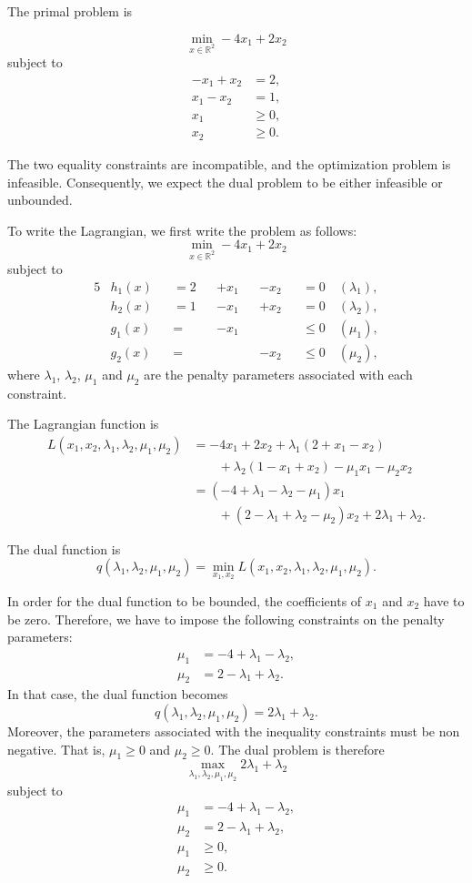 
The primal problem is

\[
\min_{x \in \mathbb{R}^2} -4x_1+2x_2
\]
subject to 
\begin{align*}
-x_1 + x_2 & = 2,\\
x_1-x_2 & = 1,\\
x_1 & \geq 0,\\
x_2 & \geq 0.
\end{align*}

The two equality constraints are incompatible, and the optimization
problem is infeasible. Consequently, we expect the dual problem to be either
infeasible or unbounded.

  To write the Lagrangian, we first write the problem as follows:
$$\min_{x \in \mathbb{R}^2} -4x_1+2x_2$$ 
subject to 
\begin{alignat*}{5}
& h_1(x) && = 2 && +x_1 && -x_2 && =0 \quad (\lambda_1),\\
& h_2(x) &&= 1 && -x_1 && +x_2 && =0 \quad (\lambda_2),\\
& g_1(x) &&= && -x_1 && && \leq 0 \quad (\mu_1),\\
& g_2(x) &&= && && -x_2 && \leq 0 \quad (\mu_2),
\end{alignat*}
where $\lambda_1$, $\lambda_2$, $\mu_1$ and $\mu_2$ are the penalty parameters
associated with each constraint.

The Lagrangian function is 
\begin{align*}
L(x_1,x_2,\lambda_1,\lambda_2,\mu_1,\mu_2) & = -4x_1+2x_2 + \lambda_1(2+x_1-x_2) \\
& \qquad + \lambda_2(1 -x_1+x_2) - \mu_1 x_1 - \mu_2 x_2\\
& = (-4+\lambda_1-\lambda_2-\mu_1)x_1\\ & \qquad + (2-\lambda_1+\lambda_2-\mu_2)x_2 + 2\lambda_1 + \lambda_2.
\end{align*}

The dual function is
\[
q(\lambda_1,\lambda_2,\mu_1,\mu_2) = \min_{x_1,x_2} L(x_1,x_2,\lambda_1,\lambda_2,\mu_1,\mu_2).
\]


In order for the dual function to be bounded, the coefficients of
$x_1$ and $x_2$ have to be zero.  Therefore, we have to impose the
following constraints on the penalty parameters:
\begin{align}
  \mu_1&=-4+\lambda_1-\lambda_2,\label{eq:3} \\
  \mu_2&=2-\lambda_1+\lambda_2. \label{eq:4}
\end{align}
In that case, the dual function becomes 
\[
q(\lambda_1,\lambda_2,\mu_1,\mu_2) =  2\lambda_1 + \lambda_2.
\]
Moreover, the parameters associated with the inequality constraints
must be non negative. That is, $\mu_1 \geq 0$ and $\mu_2 \geq
0$. The dual problem is therefore
\[
\max_{\lambda_1,\lambda_2,\mu_1,\mu_2} 2\lambda_1 + \lambda_2
\]
subject to
\begin{align*}
  \mu_1&=-4+\lambda_1-\lambda_2, \\
  \mu_2&=2-\lambda_1+\lambda_2, \\
  \mu_1 & \geq 0, \\
  \mu_2 & \geq 0. \\
\end{align*}

